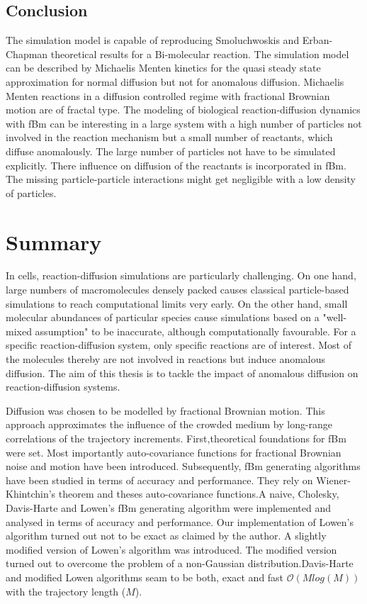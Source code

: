 \documentclass[
  a4paper,BCOR10mm,oneside,
  headsepline,footsepline,%
  fleqn,openbib
]{scrbook}
\begin{document}
\newpage
\section{Conclusion}
The simulation model is capable of reproducing Smoluchwoskis and Erban-Chapman theoretical results for a Bi-molecular reaction. 
The simulation model can be described by Michaelis Menten kinetics for the quasi steady state approximation for normal diffusion but not for anomalous diffusion.
Michaelis Menten reactions in a diffusion controlled regime with fractional Brownian motion are of fractal type. The modeling of biological reaction-diffusion dynamics with fBm can be interesting in a large system with a high number of particles not involved in the reaction mechanism but a small number of reactants, which diffuse anomalously. The large number of particles not  have to be simulated explicitly. There influence on diffusion of the reactants is incorporated in fBm. The missing particle-particle interactions might get negligible with a low density of particles.  
\chapter{Summary}
In cells, reaction-diffusion simulations are particularly challenging. On one hand, large numbers of macromolecules densely packed causes classical particle-based simulations to reach computational limits very early.  On the other hand, small molecular abundances of particular species cause simulations based on a "well-mixed assumption" to be inaccurate, although computationally favourable. For a specific reaction-diffusion system, only specific reactions are of interest. Most of the molecules thereby are not involved in reactions but induce anomalous diffusion. The aim of this thesis is to tackle the impact of anomalous diffusion on reaction-diffusion systems. \par
Diffusion was chosen to be modelled by fractional Brownian motion. This approach approximates the influence of the crowded medium by long-range correlations of the trajectory increments. First,theoretical foundations for fBm were set. Most importantly auto-covariance functions for fractional Brownian noise and motion have been introduced. Subsequently, fBm generating algorithms have been studied in terms of accuracy and performance. They rely on Wiener-Khintchin's theorem and theses auto-covariance functions.A naive, Cholesky, Davis-Harte and Lowen's fBm generating algorithm were implemented and analysed in terms of accuracy and performance. Our implementation of Lowen's algorithm turned out not to be exact as claimed by the author\cite{Lowen1999}. A slightly modified version of Lowen's algorithm was introduced. The modified version turned out to overcome the problem of a non-Gaussian distribution.Davis-Harte and modified Lowen algorithms seam to be both, exact and fast $\mathcal{O}(M log(M))$ with the trajectory length ($M$).\par
\end{document}
